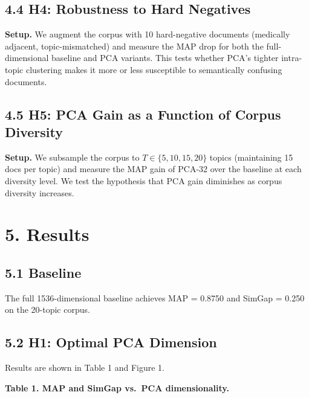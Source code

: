 \documentclass[
  11pt,
  letterpaper,
]{article}
\begin{document}
\subsection{4.4 H4: Robustness to Hard
Negatives}\label{h4-robustness-to-hard-negatives}

\textbf{Setup.} We augment the corpus with 10 hard-negative documents
(medically adjacent, topic-mismatched) and measure the MAP drop for both
the full-dimensional baseline and PCA variants. This tests whether PCA's
tighter intra-topic clustering makes it more or less susceptible to
semantically confusing documents.

\subsection{4.5 H5: PCA Gain as a Function of Corpus
Diversity}\label{h5-pca-gain-as-a-function-of-corpus-diversity}

\textbf{Setup.} We subsample the corpus to \(T \in \{5, 10, 15, 20\}\)
topics (maintaining 15 docs per topic) and measure the MAP gain of
PCA-32 over the baseline at each diversity level. We test the hypothesis
that PCA gain diminishes as corpus diversity increases.

\section{5. Results}\label{results}

\subsection{5.1 Baseline}\label{baseline}

The full 1536-dimensional baseline achieves MAP = 0.8750 and SimGap =
0.250 on the 20-topic corpus.

\subsection{5.2 H1: Optimal PCA
Dimension}\label{h1-optimal-pca-dimension}

Results are shown in Table 1 and Figure 1.

\textbf{Table 1. MAP and SimGap vs.~PCA dimensionality.}
\end{document}
